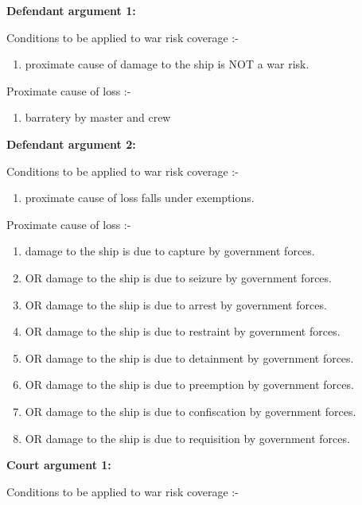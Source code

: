      \textbf{Defendant argument 1:}
     
     Conditions to be applied to war risk coverage :-
     
     \begin{enumerate}
         \item proximate cause of damage to the ship is NOT a war risk.
     \end{enumerate}
    
     Proximate cause of loss :- 
     
     \begin{enumerate}
         \item barratery by master and crew
     \end{enumerate}
    
                
     \textbf{Defendant argument 2:}
     
     Conditions to be applied to war risk coverage :-
     
     \begin{enumerate}
         \item proximate cause of loss falls under exemptions.
     \end{enumerate}
                
     
     Proximate cause of loss :-
     
     \begin{enumerate}
        \item damage to the ship is due to capture by government forces.
        \item OR damage to the ship is due to seizure by government forces.
        \item OR damage to the ship is due to arrest by government forces.
        \item OR damage to the ship is due to restraint by government forces.
        \item OR damage to the ship is due to detainment by government forces.
        \item OR damage to the ship is due to preemption by government forces.
        \item OR damage to the ship is due to confiscation by government forces.
        \item OR damage to the ship is due to requisition by government forces.
     \end{enumerate}
                
     \textbf{Court argument 1:}
     
     Conditions to be applied to war risk coverage :-
     
